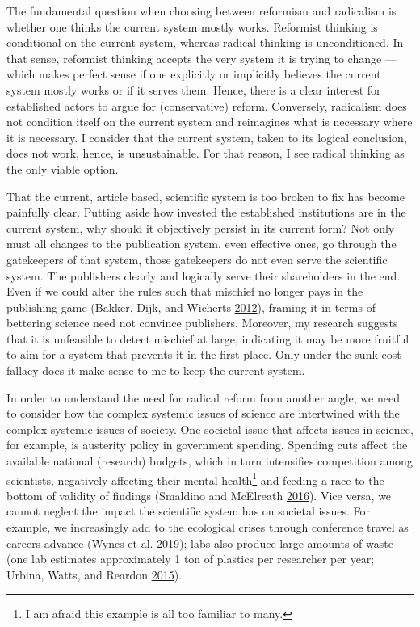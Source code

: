 \documentclass[a5paper]{book}
\let\rmarkdownfootnote\footnote%
\def\footnote{\protect\rmarkdownfootnote}
\begin{document}
The fundamental question when choosing between reformism and radicalism
is whether one thinks the current system mostly works. Reformist
thinking is conditional on the current system, whereas radical thinking
is unconditioned. In that sense, reformist thinking accepts the very
system it is trying to change --- which makes perfect sense if one
explicitly or implicitly believes the current system mostly works or if
it serves them. Hence, there is a clear interest for established actors
to argue for (conservative) reform. Conversely, radicalism does not
condition itself on the current system and reimagines what is necessary
where it is necessary. I consider that the current system, taken to its
logical conclusion, does not work, hence, is unsustainable. For that
reason, I see radical thinking as the only viable option.

That the current, article based, scientific system is too broken to fix
has become painfully clear. Putting aside how invested the established
institutions are in the current system, why should it objectively
persist in its current form? Not only must all changes to the
publication system, even effective ones, go through the gatekeepers of
that system, those gatekeepers do not even serve the scientific system.
The publishers clearly and logically serve their shareholders in the
end. Even if we could alter the rules such that mischief no longer pays
in the publishing game (Bakker, Dijk, and Wicherts
\protect\hyperlink{ref-doi:10.1177ux2f1745691612459060}{2012}), framing
it in terms of bettering science need not convince publishers. Moreover,
my research suggests that it is unfeasible to detect mischief at large,
indicating it may be more fruitful to aim for a system that prevents it
in the first place. Only under the sunk cost fallacy does it make sense
to me to keep the current system.

In order to understand the need for radical reform from another angle,
we need to consider how the complex systemic issues of science are
intertwined with the complex systemic issues of society. One societal
issue that affects issues in science, for example, is austerity policy
in government spending. Spending cuts affect the available national
(research) budgets, which in turn intensifies competition among
scientists, negatively affecting their mental health\footnote{I am
  afraid this example is all too familiar to many.} and feeding a race
to the bottom of validity of findings (Smaldino and McElreath
\protect\hyperlink{ref-doi:10.1098ux2frsos.160384}{2016}). Vice versa,
we cannot neglect the impact the scientific system has on societal
issues. For example, we increasingly add to the ecological crises
through conference travel as careers advance (Wynes et al.
\protect\hyperlink{ref-doi:10.1016ux2fj.jclepro.2019.04.109}{2019});
labs also produce large amounts of waste (one lab estimates
approximately 1 ton of plastics per researcher per year; Urbina, Watts,
and Reardon \protect\hyperlink{ref-doi:10.1038ux2f528479c}{2015}).
\end{document}
